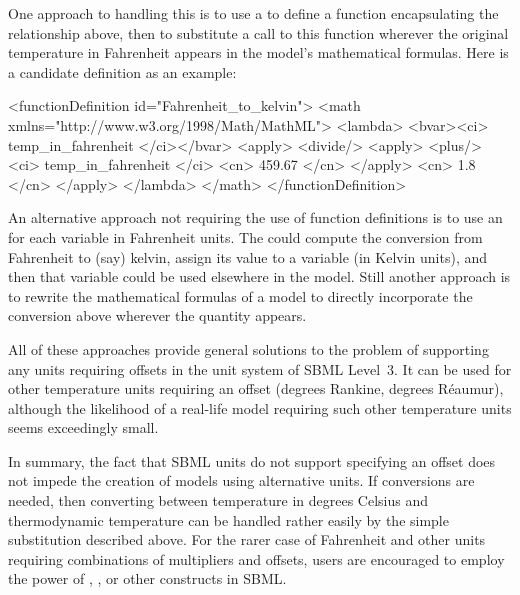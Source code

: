 \begin{itemize}
  One approach to handling this is to use a \FunctionDefinition to
  define a function encapsulating the relationship above, then to
  substitute a call to this function wherever the original
  temperature in Fahrenheit appears in the model's mathematical
  formulas.  Here is a candidate definition as an example:
  \begin{example}
<functionDefinition id="Fahrenheit_to_kelvin">
    <math xmlns="http://www.w3.org/1998/Math/MathML">
        <lambda>
            <bvar><ci> temp_in_fahrenheit </ci></bvar>
            <apply>
                <divide/>
                <apply>
                    <plus/>
                    <ci> temp_in_fahrenheit </ci>
                    <cn> 459.67 </cn>
                </apply>
                <cn> 1.8 </cn>
            </apply>
        </lambda>
    </math>
</functionDefinition>
  \end{example}
  
  An alternative approach not requiring the use of function
  definitions is to use an \AssignmentRule for each variable in
  Fahrenheit units.  The \AssignmentRule could compute the
  conversion from Fahrenheit to (say) kelvin, assign its value to
  a variable (in Kelvin units), and then that variable could be
  used elsewhere in the model.  Still another approach is to
  rewrite the mathematical formulas of a model to directly
  incorporate the conversion above wherever
  the quantity appears.

\end{itemize}


All of these approaches provide general solutions to the problem
of supporting any units requiring offsets in the unit system of
SBML Level~3.  It can be used for other temperature units
requiring an offset (\eg degrees Rankine, degrees R\'{e}aumur),
although the likelihood of a real-life model requiring such other
temperature units seems exceedingly small.

In summary, the fact that SBML units do not support specifying an
offset does not impede the creation of models using alternative
units.  If conversions are needed, then converting between
temperature in degrees Celsius and thermodynamic temperature can
be handled rather easily by the simple substitution described
above.  For the rarer case of Fahrenheit and other units requiring
combinations of multipliers and offsets, users are encouraged to
employ the power of \FunctionDefinition, \AssignmentRule, or other
constructs in SBML.



